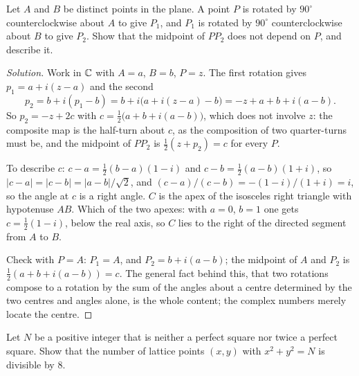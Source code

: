\begin{example}
Let $A$ and $B$ be distinct points in the plane. A point $P$ is rotated by $90^\circ$ counterclockwise about $A$ to give $P_1$, and $P_1$ is rotated by $90^\circ$ counterclockwise about $B$ to give $P_2$. Show that the midpoint of $PP_2$ does not depend on $P$, and describe it.
\end{example}

\begin{proof}[Solution]
Work in $\mathbb{C}$ with $A=a$, $B=b$, $P=z$. The first rotation gives $p_1=a+i(z-a)$ and the second
\[
p_2=b+i(p_1-b)=b+i\bigl(a+i(z-a)-b\bigr)=-z+a+b+i(a-b).
\]
So $p_2=-z+2c$ with $c=\tfrac12\bigl(a+b+i(a-b)\bigr)$, which does not involve $z$: the composite map is the half-turn about $c$, as the composition of two quarter-turns must be, and the midpoint of $PP_2$ is $\tfrac12(z+p_2)=c$ for every $P$.

To describe $c$: $c-a=\tfrac12(b-a)(1-i)$ and $c-b=\tfrac12(a-b)(1+i)$, so $|c-a|=|c-b|=|a-b|/\sqrt2$, and $(c-a)/(c-b)=-(1-i)/(1+i)=i$, so the angle at $c$ is a right angle. $C$ is the apex of the isosceles right triangle with hypotenuse $AB$. Which of the two apexes: with $a=0$, $b=1$ one gets $c=\tfrac12(1-i)$, below the real axis, so $C$ lies to the right of the directed segment from $A$ to $B$.

Check with $P=A$: $P_1=A$, and $P_2=b+i(a-b)$; the midpoint of $A$ and $P_2$ is $\tfrac12(a+b+i(a-b))=c$. The general fact behind this, that two rotations compose to a rotation by the sum of the angles about a centre determined by the two centres and angles alone, is the whole content; the complex numbers merely locate the centre.
\end{proof}

\begin{example}
Let $N$ be a positive integer that is neither a perfect square nor twice a perfect square. Show that the number of lattice points $(x,y)$ with $x^2+y^2=N$ is divisible by $8$.
\end{example}

